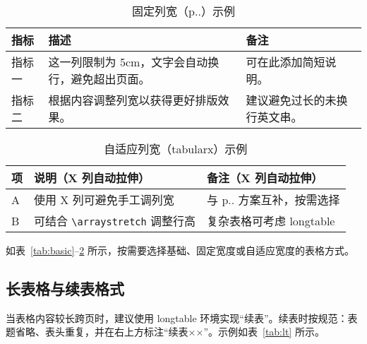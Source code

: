 \begin{table}[H]
  \centering
  \caption{固定列宽（p{..}）示例}
  \label{tab:fixed}
  \renewcommand{\arraystretch}{1.2}
  \begin{tabular}{p{3cm} p{5cm} p{4cm}}
    \toprule
    指标 & 描述 & 备注 \\
    \midrule
    指标一 & 这一列限制为 5cm，文字会自动换行，避免超出页面。 & 可在此添加简短说明。 \\
    指标二 & 根据内容调整列宽以获得更好排版效果。 & 建议避免过长的未换行英文串。 \\
    \bottomrule
  \end{tabular}
\end{table}

\begin{table}[H]
  \centering
  \caption{自适应列宽（tabularx）示例}
  \label{tab:tabularx}
  \begin{tabularx}{\textwidth}{lXX}
    \toprule
    项 & 说明（X 列自动拉伸） & 备注（X 列自动拉伸） \\
    \midrule
    A & 使用 X 列可避免手工调列宽 & 与 p{..} 方案互补，按需选择 \\
    B & 可结合 \verb|\arraystretch| 调整行高 & 复杂表格可考虑 longtable \\
    \bottomrule
  \end{tabularx}
\end{table}

如表~\ref{tab:basic}–\ref{tab:tabularx} 所示，按需要选择基础、固定宽度或自适应宽度的表格方式。

\subsection{长表格与续表格式}
当表格内容较长跨页时，建议使用 longtable 环境实现“续表”。续表时按规范：表题省略、表头重复，并在右上方标注“续表××”。示例如表~\ref{tab:lt} 所示。

